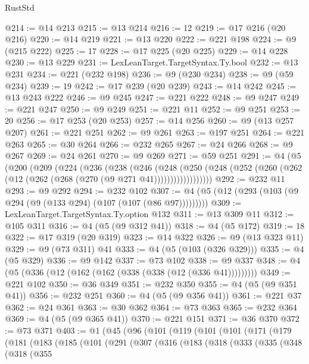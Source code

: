 \begin{lexlean}{RustStd}
\begin{coremodule}
@214 := @14 @213
@215 := @13 @214
@216 := 12
@219 := @17 @216 (@20 @216)
@220 := @14 @219
@221 := @13 @220
@222 := @221 @198
@224 := @9 (@215 @222)
@225 := 17
@228 := @17 @225 (@20 @225)
@229 := @14 @228
@230 := @13 @229
@231 := LexLeanTarget.TargetSyntax.Ty.bool
@232 := @13 @231
@234 := @221 (@232 @198)
@236 := @9 (@230 @234)
@238 := @9 (@59 @234)
@239 := 19
@242 := @17 @239 (@20 @239)
@243 := @14 @242
@245 := @13 @243 @222
@246 := @9 @245
@247 := @221 @222
@248 := @9 @247
@249 := @221 @247
@250 := @9 @249
@251 := @221 @11
@252 := @9 @251
@253 := 20
@256 := @17 @253 (@20 @253)
@257 := @14 @256
@260 := @9 (@13 @257 @207)
@261 := @221 @251
@262 := @9 @261
@263 := @197 @251
@264 := @221 @263
@265 := @30 @264
@266 := @232 @265
@267 := @24 @266
@268 := @9 @267
@269 := @24 @261
@270 := @9 @269
@271 := @59 @251
@291 := @4
    (@5
      (@200
        (@209
          (@224
            (@236
              (@238
                (@246
                  (@248
                    (@250
                      (@248 (@252 (@260 (@262 (@12 (@262 (@268 (@270 (@9 @271 @41))))))))))))))))))
@292 := @232 @11
@293 := @9 @292
@294 := @232 @102
@307 := @4 (@5 (@12 (@293 (@103 (@9 @294 (@9 (@133 @294) (@107 (@107 (@86 @97)))))))))
@309 := LexLeanTarget.TargetSyntax.Ty.option @132
@311 := @13 @309 @11
@312 := @105 @311
@316 := @4 (@5 (@9 @312 @41))
@318 := @4 (@5 @172)
@319 := 18
@322 := @17 @319 (@20 @319)
@323 := @14 @322
@326 := @9 (@13 @323 @11)
@329 := @9 (@73 @311) @41
@333 := @4 (@5 (@103 (@326 @329)))
@335 := @4 (@5 @329)
@336 := @9 @142
@337 := @73 @102
@338 := @9 @337
@348 := @4 (@5 (@336 (@12 (@162 (@162 (@338 (@338 (@12 (@336 @41)))))))))
@349 := @221 @102
@350 := @36 @349
@351 := @232 @350
@355 := @4 (@5 (@9 @351 @41))
@356 := @232 @251
@360 := @4 (@5 (@9 @356 @41))
@361 := @221 @37
@362 := @24 @361
@363 := @30 @362
@364 := @73 @363
@365 := @232 @364
@369 := @4 (@5 (@9 @365 @41))
@370 := @221 @151
@371 := @36 @370
@372 := @73 @371
@403 := @1
    (@45
      (@96
        (@101
          (@119
            (@101
              (@101
                (@171
                  (@179
                    (@181
                      (@183
                        (@185
                          (@101
                            (@291
                              (@307
                                (@316
                                  (@183
                                    (@318
                                      (@333
                                        (@335
                                          (@348
                                            (@318
                                              (@355

\end{coremodule}
\end{lexlean}
